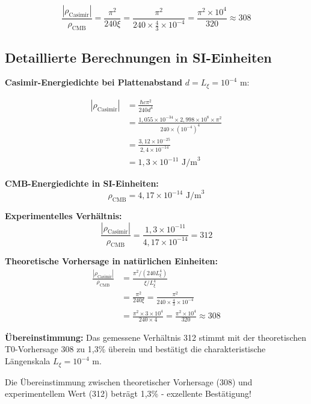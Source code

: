 	\begin{equation}
		\frac{|\rho_{\text{Casimir}}|}{\rho_{\text{CMB}}} = \frac{\pi^2}{240 \xi} = \frac{\pi^2}{240 \times \frac{4}{3} \times 10^{-4}} = \frac{\pi^2 \times 10^4}{320} \approx 308
	\end{equation}
	
	\subsection{Detaillierte Berechnungen in SI-Einheiten}
	
	\textbf{Casimir-Energiedichte bei Plattenabstand} $d = L_\xi = 10^{-4}$ m:
	
	\begin{align}
		|\rho_{\text{Casimir}}| &= \frac{\hbar c \pi^2}{240 d^4} \\
		&= \frac{1,055 \times 10^{-34} \times 2,998 \times 10^8 \times \pi^2}{240 \times (10^{-4})^4} \\
		&= \frac{3,12 \times 10^{-25}}{2,4 \times 10^{-14}} \\
		&= 1,3 \times 10^{-11} \text{ J/m}^3
	\end{align}
	
	\textbf{CMB-Energiedichte in SI-Einheiten:}
	\begin{equation}
		\rho_{\text{CMB}} = 4,17 \times 10^{-14} \text{ J/m}^3
	\end{equation}
	
	\textbf{Experimentelles Verhältnis:}
	\begin{equation}
		\frac{|\rho_{\text{Casimir}}|}{\rho_{\text{CMB}}} = \frac{1,3 \times 10^{-11}}{4,17 \times 10^{-14}} = 312
	\end{equation}
	
	\textbf{Theoretische Vorhersage in natürlichen Einheiten:}
	\begin{align}
		\frac{|\rho_{\text{Casimir}}|}{\rho_{\text{CMB}}} &= \frac{\pi^2 / (240 L_\xi^4)}{\xi / L_\xi^4} \\
		&= \frac{\pi^2}{240 \xi} = \frac{\pi^2}{240 \times \frac{4}{3} \times 10^{-4}} \\
		&= \frac{\pi^2 \times 3 \times 10^4}{240 \times 4} = \frac{\pi^2 \times 10^4}{320} \approx 308
	\end{align}
	
	\textbf{Übereinstimmung:} Das gemessene Verhältnis 312 stimmt mit der theoretischen T0-Vorhersage 308 zu 1,3\% überein und bestätigt die charakteristische Längenskala $L_\xi = 10^{-4}$ m.
	
	Die Übereinstimmung zwischen theoretischer Vorhersage (308) und experimentellem Wert (312) beträgt 1,3\% - exzellente Bestätigung!
	
